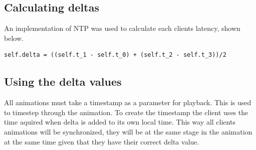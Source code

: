 \subsection{Calculating deltas}
An implementation of NTP was used to calculate each clients latency, shown below.

\begin{verbatim}
self.delta = ((self.t_1 - self.t_0) + (self.t_2 - self.t_3))/2
\end{verbatim}

\subsection {Using the delta values}

All animations must take a timestamp as a parameter for playback. This is used to timestep through the animation. To create the timestamp the client uses the time aquired when delta is added to its own local time. This way all clients animations will be synchronized, they will be at the same stage in the animation at the same time given that they have their correct delta value. 


